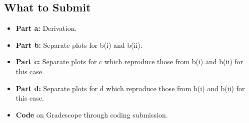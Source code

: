 \documentclass{article}
\begin{document}
\begin{aprob}
    \subsection*{What to Submit}
    \begin{itemize}
        \item \textbf{Part a:} Derivation.
        \item \textbf{Part b:} Separate plots for b(i) and b(ii).
        \item \textbf{Part c:} Separate plots for c which reproduce those from b(i) and b(ii) for this case.
        \item \textbf{Part d:} Separate plots for d which reproduce those from b(i) and b(ii) for this case.
        \item \textbf{Code} on Gradescope through coding submission.
    \end{itemize}
\end{aprob}
\end{document}
